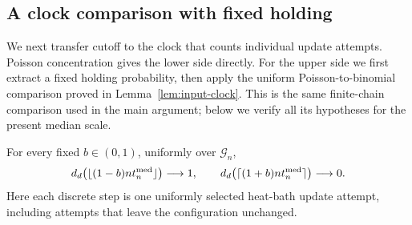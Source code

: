 \subsection{A clock comparison with fixed holding}

We next transfer cutoff to the clock that counts individual update
attempts.  Poisson concentration gives the lower side directly.  For
the upper side we first extract a fixed holding probability, then apply
the uniform Poisson-to-binomial comparison proved in
Lemma~\ref{lem:input-clock}.  This is the same finite-chain comparison
used in the main argument; below we verify all its hypotheses for the
present median scale.

\begin{proposition}
\label{rcut:prop:discrete-cutoff}
For every fixed $b\in(0,1)$, uniformly over $\mathcal G_n$,
\begin{equation}
 d_d\bigl(\lfloor(1-b)nt_n^{\rm med}\rfloor\bigr)\longrightarrow1,
 \qquad
 d_d\bigl(\lceil(1+b)nt_n^{\rm med}\rceil\bigr)\longrightarrow0.
 \label{rcut:eq:discrete-cutoff-sides}
\end{equation}
Here each discrete step is one uniformly selected heat-bath update
attempt, including attempts that leave the configuration unchanged.
\end{proposition}

